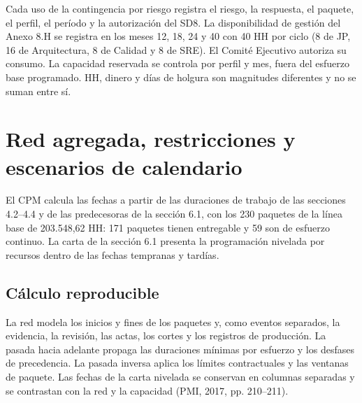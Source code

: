 Cada uso de la contingencia por riesgo registra el riesgo, la respuesta, el paquete, el perfil, el período y la autorización del SD8. La disponibilidad de gestión del Anexo 8.H se registra en los meses 12, 18, 24 y 40 con 40 HH por ciclo (8 de JP, 16 de Arquitectura, 8 de Calidad y 8 de SRE). El Comité Ejecutivo autoriza su consumo. La capacidad reservada se controla por perfil y mes, fuera del esfuerzo base programado. HH, dinero y días de holgura son magnitudes diferentes y no se suman entre sí.

\section{Red agregada, restricciones y escenarios de calendario}

El CPM calcula las fechas a partir de las duraciones de trabajo de las secciones 4.2--4.4 y de las predecesoras de la sección 6.1, con los 230 paquetes de la línea base de 203.548,62 HH: 171 paquetes tienen entregable y 59 son de esfuerzo continuo. La carta de la sección 6.1 presenta la programación nivelada por recursos dentro de las fechas tempranas y tardías.

\subsection{Cálculo reproducible}

La red modela los inicios y fines de los paquetes y, como eventos separados, la evidencia, la revisión, las actas, los cortes y los registros de producción. La pasada hacia adelante propaga las duraciones mínimas por esfuerzo y los desfases de precedencia. La pasada inversa aplica los límites contractuales y las ventanas de paquete. Las fechas de la carta nivelada se conservan en columnas separadas y se contrastan con la red y la capacidad (PMI, 2017, pp. 210--211).

